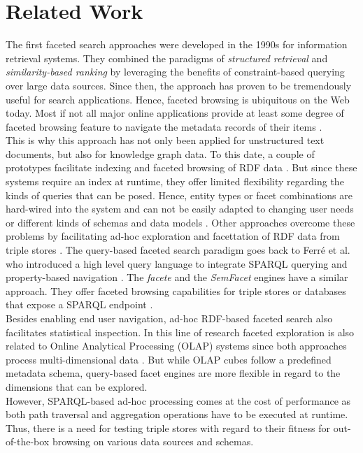 \section{Related Work}
\label{sec:related-work}
The first faceted search approaches were developed in the 1990s for information retrieval systems. They combined the paradigms of \textit{structured retrieval} and \textit{similarity-based ranking} by leveraging the benefits of constraint-based querying over large data sources. Since then, the approach has proven to be tremendously useful for search applications. Hence, faceted browsing is ubiquitous on the Web today. Most if not all major online applications provide at least some degree of faceted browsing feature to navigate the metadata records of their items \cite{tunkelang}.\\ 
This is why this approach has not only been applied for unstructured text documents, but also for knowledge graph data. To this date, a couple of prototypes facilitate indexing and faceted browsing of RDF data \cite{cheng, davies, hahn, waitelonis, moreno-vega}. But since these systems require an index at runtime, they offer limited flexibility regarding the kinds of queries that can be posed. Hence, entity types or facet combinations are hard-wired into the system and can not be easily adapted to changing user needs or different kinds of schemas and data models \cite{wenige}. Other approaches overcome these problems by facilitating ad-hoc exploration and facettation of RDF data from triple stores \cite{stadler, kremen, ferre, arenas}. The query-based faceted search paradigm goes back to Ferr\'{e} et al. who introduced a high level query language to integrate SPARQL querying and property-based navigation \cite{ferre}. The \textit{facete} and the \textit{SemFacet} engines \cite{arenas} have a similar approach. They offer faceted browsing capabilities for triple stores or databases that expose a SPARQL endpoint \cite{stadler}.\\
Besides enabling end user navigation, ad-hoc RDF-based faceted search also facilitates statistical inspection. In this line of research faceted exploration is also related to Online Analytical Processing (OLAP) systems since both approaches process multi-dimensional data \cite{ben-yitzhak}. But while OLAP cubes follow a predefined metadata schema, query-based facet engines are more flexible in regard to the dimensions that can be explored.\\
However, SPARQL-based ad-hoc processing comes at the cost of performance as both path traversal and aggregation operations have to be executed at runtime. Thus, there is a need for testing triple stores with regard to their fitness for out-of-the-box browsing on various data sources and schemas. 
